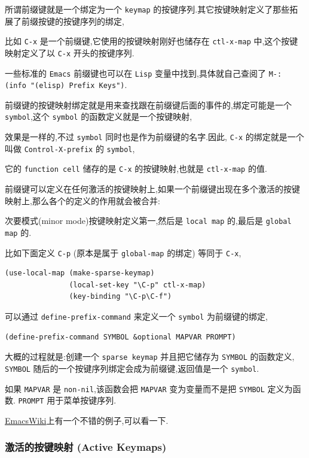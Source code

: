 \documentclass[11pt]{article}
\begin{document}
所谓前缀键就是一个绑定为一个 \texttt{keymap} 的按键序列.其它按键映射定义了那些拓展了前缀按键的按键序列的绑定,

比如 \texttt{C-x} 是一个前缀键,它使用的按键映射刚好也储存在 \texttt{ctl-x-map} 中,这个按键映射定义了以 \texttt{C-x} 开头的按键序列.

一些标准的 \texttt{Emacs} 前缀键也可以在 \texttt{Lisp} 变量中找到,具体就自己查阅了 \texttt{M-: (info "(elisp) Prefix Keys")}.

前缀键的按键映射绑定就是用来查找跟在前缀键后面的事件的,绑定可能是一个 \texttt{symbol},这个 \texttt{symbol} 的函数定义就是一个按键映射,

效果是一样的,不过 \texttt{symbol} 同时也是作为前缀键的名字.因此, \texttt{C-x} 的绑定就是一个叫做 \texttt{Control-X-prefix} 的 \texttt{symbol},

它的 \texttt{function cell} 储存的是 \texttt{C-x} 的按键映射,也就是 \texttt{ctl-x-map} 的值.

前缀键可以定义在任何激活的按键映射上,如果一个前缀键出现在多个激活的按键映射上,那么各个的定义的作用就会被合并:

次要模式(minor mode)按键映射定义第一,然后是 \texttt{local map} 的,最后是 \texttt{global map} 的.

比如下面定义 \texttt{C-p} (原本是属于 \texttt{global-map} 的绑定) 等同于 \texttt{C-x},

\begin{verbatim}
(use-local-map (make-sparse-keymap)
               (local-set-key "\C-p" ctl-x-map)
               (key-binding "\C-p\C-f")
\end{verbatim}

可以通过 \texttt{define-prefix-command} 来定义一个 \texttt{symbol} 为前缀键的绑定,

\begin{verbatim}
(define-prefix-command SYMBOL &optional MAPVAR PROMPT)
\end{verbatim}

大概的过程就是:创建一个 \texttt{sparse keymap} 并且把它储存为 \texttt{SYMBOL} 的函数定义, \texttt{SYMBOL} 随后的一个按键序列绑定会成为前缀键,返回值是一个 \texttt{symbol}.

如果 \texttt{MAPVAR} 是 \texttt{non-nil},该函数会把 \texttt{MAPVAR} 变为变量而不是把 \texttt{SYMBOL} 定义为函数. \texttt{PROMPT} 用于菜单按键序列.

\href{https://www.emacswiki.org/emacs/PrefixKey}{EmacsWiki}上有一个不错的例子,可以看一下.



\subsubsection{激活的按键映射 (Active Keymaps)}
\label{sec:org8e19d57}
\end{document}
